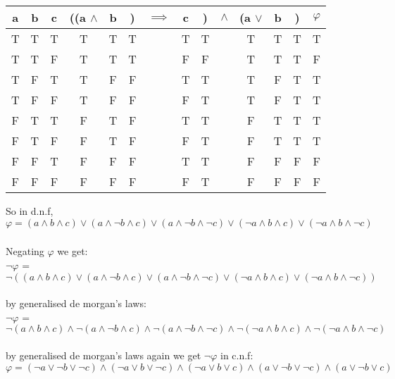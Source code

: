 \documentclass[]{article}
\begin{document}
\subsubsection{}
\begin{center}
\begin{tabular}{|c|c|c|cccccccccc|c|}
	\hline 
	a & b & c & ((a $\wedge$&b&)&$\implies$&c&)&$\wedge$&(a $\vee$&b&)& $\varphi$ \\ 
	\hline 
	T & T & T &T&T&T&&T&T&&T&T&T& T \\ 
	\hline 
	T & T & F &T&T&T&&F&F&&T&T&T&  F \\ 
	\hline 
	T & F & T &T&F&F&&T&T&&T&F&T& T  \\ 
	\hline 
	T & F & F &T&F&F&&F&T&&T&F&T& T \\ 
	\hline 
	F & T & T &F&T&F&&T&T&&F&T&T& T \\ 
	\hline 
	F & T & F &F&T&F&&F&T&&F&T&T& T  \\ 
	\hline 
	F & F & T &F&F&F&&T&T&&F&F&F& F  \\ 
	\hline 
	F & F & F &F&F&F&&F&T&&F&F&F&  F \\ 
	\hline 
\end{tabular} 
\end{center}
So in d.n.f, $\varphi = (a \wedge b \wedge c) \vee (a \wedge \neg b \wedge c) \vee (a \wedge \neg b \wedge \neg c) \vee (\neg a \wedge b \wedge c) \vee (\neg a \wedge b \wedge \neg c)$
\subsubsection{}
Negating $\varphi $ we get:
\\
$\neg \varphi$ = $\neg((a \wedge b \wedge c) \vee (a \wedge \neg b \wedge c) \vee (a \wedge \neg b \wedge \neg c) \vee (\neg a \wedge b \wedge c) \vee (\neg a \wedge b \wedge \neg c))$
\\
\\
by generalised de morgan's laws:
\\
$\neg \varphi$ = $\neg(a \wedge b \wedge c) \wedge \neg(a \wedge \neg b \wedge c) \wedge \neg(a \wedge \neg b \wedge \neg c) \wedge \neg(\neg a \wedge b \wedge c) \wedge \neg(\neg a \wedge b \wedge \neg c)$
\\
\\
by generalised de morgan's laws again we get $\neg \varphi$ in c.n.f:
\\
$\varphi = (\neg a \vee \neg b \vee \neg c) \wedge (\neg a\vee b \vee \neg c) \wedge (\neg a \vee b \vee c) \wedge (a \vee \neg b \vee \neg c) \wedge (a \vee \neg b \vee c)$
\end{document}
